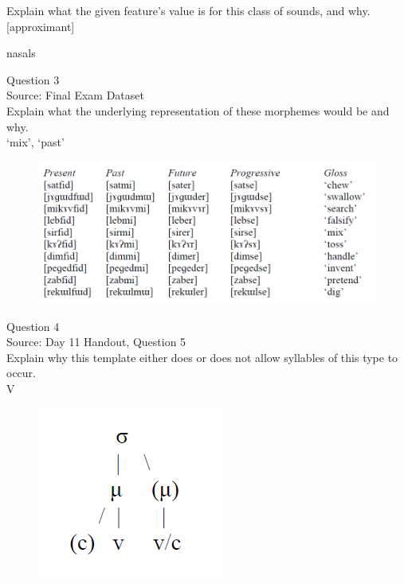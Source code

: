 \documentclass[12pt]{article}
\begin{document}
Explain what the given feature’s value is for this class of sounds, and why.\\

{[approximant]}

nasals


\newpage

{\large Question 3}\\

Source: Final Exam Dataset\\

Explain what the underlying representation of these morphemes would be and why.\\

`mix', `past'

\begin{figure}[H]
\includegraphics{../images/final_dataset.png}
\end{figure}

\newpage

{\large Question 4}\\

Source: Day 11 Handout, Question 5\\

Explain why this template either does or does not allow syllables of this type to occur.\\

V

\begin{figure}[H]
\includegraphics{../images/ponapean_syllabletemplate.png}
\end{figure}
\end{document}

